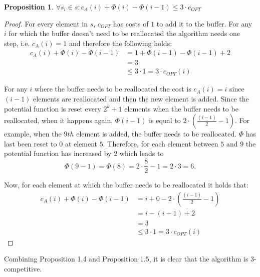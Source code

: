 \documentclass[a4paper,12pt]{scrartcl}
\newcounter{sheet}
\newtheorem{proposition}{Proposition}[sheet]
\begin{document}
\begin{proposition} $\forall s_i \in s: c_A(i) + \Phi(i) - \Phi(i-1) \leq 3 \cdot c_{OPT}$ \end{proposition}
\begin{proof}
For every element in $s$, $c_{OPT}$ has costs of $1$ to add it to the buffer.
For any $i$ for which the buffer doesn't need to be reallocated the algorithm needs one step, i.e. $c_A(i) = 1$ and therefore the following holds:
\begin{align*}
c_A(i) + \Phi(i) - \Phi(i-1) &= 1 + \Phi(i-1) - \Phi(i-1) + 2 \\
&= 3 \\
&\leq 3 \cdot 1 = 3 \cdot c_{OPT}(i)
\end{align*}

For any $i$ where the buffer needs to be reallocated the cost is $c_A(i) = i$ since $(i-1)$ elements are reallocated and then the new element is added. Since the potential function is \glqq reset\grqq{} every $2^k+1$ elements when the buffer needs to be reallocated, when it happens again, $\Phi(i-1)$ is equal to $2\cdot \left(\frac{(i-1)}{2}-1\right)$. For example, when the $9th$ element is added, the buffer needs to be reallocated. $\Phi$ has last been reset to $0$ at element $5$. Therefore, for each element between $5$ and $9$ the potential function has increased by $2$ which leads to 
\[\Phi(9-1) = \Phi(8) = 2 \cdot \frac{8}{2} -1 = 2 \cdot 3 = 6.\] 

Now, for each element at which the buffer needs to be reallocated it holds that:
\begin{align*}
c_A(i) + \Phi(i) - \Phi(i-1) &= i + 0 - 2 \cdot \left(\frac{(i-1)}{2} - 1\right) \\
&= i - (i-1) + 2 \\
&= 3 \\
&\leq 3 \cdot 1 = 3 \cdot c_{OPT}(i)
\end{align*}
\end{proof}

Combining Proposition 1.4 and Proposition 1.5, it is clear that the algorithm is $3$-competitive.
\end{document}
